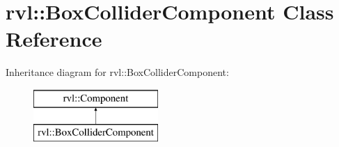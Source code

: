 \hypertarget{classrvl_1_1_box_collider_component}{}\section{rvl\+:\+:Box\+Collider\+Component Class Reference}
\label{classrvl_1_1_box_collider_component}
Inheritance diagram for rvl\+:\+:Box\+Collider\+Component\+:\begin{figure}[H]
\begin{center}
\leavevmode
\includegraphics[height=2.000000cm]{classrvl_1_1_box_collider_component}
\end{center}
\end{figure}
